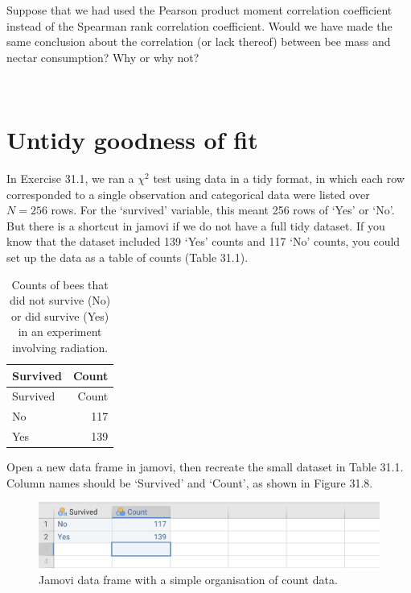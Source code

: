 \documentclass[
]{scrbook}
\begin{document}
Suppose that we had used the Pearson product moment correlation coefficient instead of the Spearman rank correlation coefficient.
Would we have made the same conclusion about the correlation (or lack thereof) between bee mass and nectar consumption?
Why or why not?

\begin{verbatim}


\end{verbatim}

\hypertarget{untidy-goodness-of-fit}{%
\section{Untidy goodness of fit}\label{untidy-goodness-of-fit}}

In Exercise 31.1, we ran a \(\chi^{2}\) test using data in a tidy format, in which each row corresponded to a single observation and categorical data were listed over \(N = 256\) rows.
For the `survived' variable, this meant 256 rows of `Yes' or `No'.
But there is a shortcut in jamovi if we do not have a full tidy dataset.
If you know that the dataset included 139 `Yes' counts and 117 `No' counts, you could set up the data as a table of counts (Table 31.1).

\begin{longtable}[]{@{}lr@{}}
\caption{\label{tab:unnamed-chunk-158}Counts of bees that did not survive (No) or did survive (Yes) in an experiment involving radiation.}\tabularnewline
\toprule
Survived & Count \\
\midrule
\endfirsthead
\toprule
Survived & Count \\
\midrule
\endhead
No & 117 \\
Yes & 139 \\
\bottomrule
\end{longtable}

Open a new data frame in jamovi, then recreate the small dataset in Table 31.1.
Column names should be `Survived' and `Count', as shown in Figure 31.8.

\begin{figure}
\includegraphics[width=1\linewidth]{img/jamovi_simple_counts} \caption{Jamovi data frame with a simple organisation of count data.}\label{fig:unnamed-chunk-159}
\end{figure}
\end{document}
